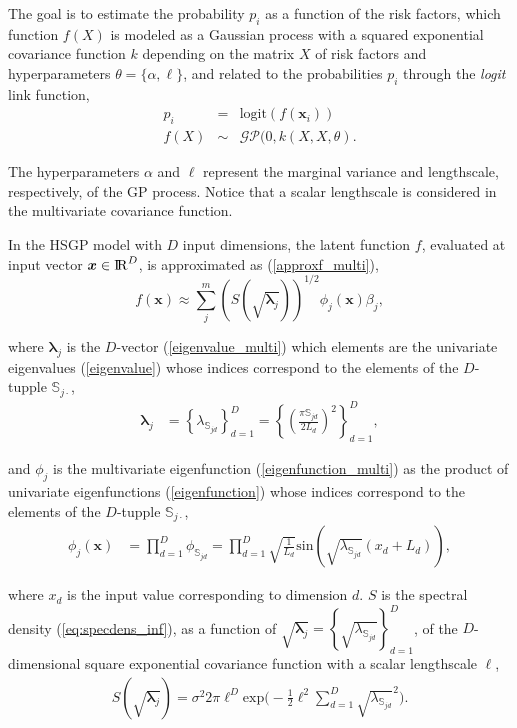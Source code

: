 \documentclass[]{interact}
\theoremstyle{plain}%
\theoremstyle{definition}
\theoremstyle{remark}
\begin{document}
\noindent The goal is to estimate the 
 probability $p_i$ as a function of the risk factors, which function $f(X)$ is modeled as a Gaussian process with a squared exponential covariance function $k$ depending on the matrix $X$ of risk factors and hyperparameters $\theta=\{\alpha,\ell\}$, and related to the probabilities $p_i$ through the {\it logit} link function,
%
\begin{eqnarray*} \label{eq:gpprior_gay}
p_i &=& \text{logit}(f(\bm{x}_i)) \nonumber \\
f(X) &\sim& \mathcal{GP}(0, k(X,X, \theta).
\end{eqnarray*}

\noindent The hyperparameters $\alpha$ and $\ell$ represent the marginal variance and lengthscale, respectively, of the GP process. Notice that a scalar lengthscale is considered in the multivariate covariance function.

In the HSGP model with $D$ input dimensions, the latent function $f$, evaluated at input vector $\bm{x} \in {\rm I\!R}^D$, is approximated as (\ref{approxf_multi}),
%
\begin{equation*}
f(\bm{x}) \approx \sum_{j}^m \left( S(\sqrt{\bm{\lambda}_j})\right)^{1/2} \phi_j(\bm{x}) \beta_j,
\end{equation*}

\noindent where $\bm{\lambda}_j$ is the $D$-vector (\ref{eigenvalue_multi}) which elements are the univariate eigenvalues (\ref{eigenvalue}) whose indices correspond to the elements of the $D$-tupple $\mathbb{S}_{j\cdotp}$,
%
\begin{align*}
\bm{\lambda}_j &= \left\{ \lambda_{\mathbb{S}_{jd}} \right\}_{d=1}^{D} = \left\{ \left(\tfrac{\pi \mathbb{S}_{jd}}{2L_d}\right)^2 \right\}_{d=1}^{D},
\end{align*}

\noindent and $\phi_j$ is the multivariate eigenfunction (\ref{eigenfunction_multi}) as the product of univariate eigenfunctions (\ref{eigenfunction}) whose indices correspond to the elements of the $D$-tupple $\mathbb{S}_{j\cdotp}$,
%
\begin{align*}
\phi_j(\bm{x}) &= \prod_{d=1}^{D} \phi_{\mathbb{S}_{jd}} = \prod_{d=1}^{D} \sqrt{\frac{1}{L_d}} \text{sin}\left(\sqrt{\lambda_{\mathbb{S}_{jd}}}(x_d+L_d)\right),
\end{align*}

\noindent where $x_d$ is the input value corresponding to dimension $d$. $S$ is the spectral density (\ref{eq:specdens_inf}), as a function of $\sqrt{\bm{\lambda}_j}= \left\{ \sqrt{\lambda_{\mathbb{S}_{jd}}} \right\}_{d=1}^{D}$, of the $D$-dimensional square exponential covariance function with a scalar lengthscale $\ell$,
%
\begin{eqnarray*}
S(\sqrt{\bm{\lambda}_j})= \sigma^2 2\pi \ell^D  \mathrm{exp}\bigg(-\frac{1}{2} \ell^2 \sum_{d=1}^D  \sqrt{\lambda_{\mathbb{S}_{jd}}}^2 \bigg). 
\end{eqnarray*}
\end{document}
